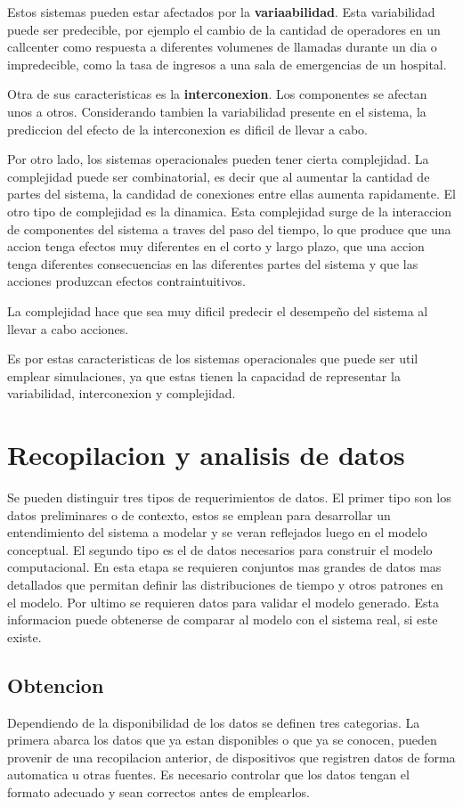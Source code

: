\documentclass[a4paper]{article}
\begin{document}
Estos sistemas pueden estar afectados por la \textbf{variaabilidad}. Esta 
variabilidad puede ser predecible, por ejemplo el cambio de la cantidad
de operadores en un callcenter como respuesta a diferentes volumenes de 
llamadas durante un dia o impredecible, como la tasa de ingresos a una
sala de emergencias de un hospital.

Otra de sus caracteristicas es la \textbf{interconexion}. Los componentes
se afectan unos a otros. Considerando tambien la variabilidad presente
en el sistema, la prediccion del efecto de la interconexion es dificil
de llevar a cabo.

Por otro lado, los sistemas operacionales pueden tener cierta complejidad.
La complejidad puede ser combinatorial, es decir que al aumentar la
cantidad de partes del sistema, la candidad de conexiones entre ellas
aumenta rapidamente.
El otro tipo de complejidad es la dinamica. Esta complejidad surge de
la interaccion de componentes del sistema a traves del paso del tiempo,
lo que produce que una accion tenga efectos muy diferentes en el corto y
largo plazo, que una accion tenga diferentes consecuencias en las diferentes
partes del sistema y que las acciones produzcan efectos contraintuitivos.

La complejidad hace que sea muy dificil predecir el desempeño del sistema
al llevar a cabo acciones.

Es por estas caracteristicas de los sistemas operacionales que puede ser
util emplear simulaciones, ya que estas tienen la capacidad de representar
la variabilidad, interconexion y complejidad.


\section*{Recopilacion y analisis de datos}
Se pueden distinguir tres tipos de requerimientos de datos. El primer tipo son 
los datos preliminares o de contexto, estos se emplean para desarrollar un 
entendimiento del sistema a modelar y se veran reflejados luego en el modelo 
conceptual.
El segundo tipo es el de datos necesarios para construir el modelo computacional.
En esta etapa se requieren conjuntos mas grandes de datos mas detallados que 
permitan definir las distribuciones de tiempo y otros patrones en el modelo.
Por ultimo se requieren datos para validar el modelo generado.
Esta informacion puede obtenerse de comparar al modelo con el sistema real,
si este existe.

\subsection*{Obtencion}
Dependiendo de la disponibilidad de los datos se definen tres categorias.
La primera abarca los datos que ya estan disponibles o que ya se conocen, 
pueden provenir de una recopilacion anterior, de dispositivos que registren
datos de forma automatica u otras fuentes. Es necesario controlar que 
los datos tengan el formato adecuado y sean correctos antes de emplearlos.
\end{document}
